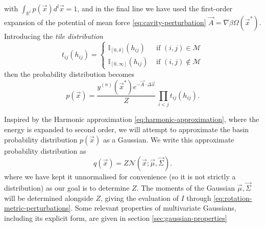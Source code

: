 \documentclass[11pt,twoside]{report}
\begin{document}
with $\int_{\mathbb{R}^l} p(\vec{x}) d^l\vec{x} = 1$, and in the final line we have used the first-order expansion of the potential of mean force \eqref{eq:cavity-perturbation} $\vec{A} = \nabla \beta\Omega(\vec{x}^*)$.
Introducing the \emph{tile distribution}
\begin{equation}\label{eq:ep-tile-distribution}
  t_{ij}(h_{ij})
  =
  \begin{cases}
    \mathbb{I}_{[0, \delta]}(h_{ij}) & \textrm{ if } (i,j) \in \mathcal{M} \\
    \mathbb{I}_{[0, \infty]}(h_{ij}) & \textrm{ if } (i,j) \notin \mathcal{M}
  \end{cases}
\end{equation}
then the probability distribution becomes
\begin{equation}\label{eq:ep-p-tiles}
  p(\vec{x})
  =
  \frac{y^{(n)}(\vec{x}^*) e^{-\vec{A} \cdot \Delta \vec{x}}}{Z}
  \,
  \prod_{i < j} t_{ij}(h_{ij}).
\end{equation}

Inspired by the Harmonic approximation \eqref{eq:harmonic-approximation}, where the energy is expanded to second order, we will attempt to approximate the basin probability distribution $p(\vec{x})$ as a Gaussian.
We write this approximate probability distribution as
\begin{equation}
  q(\vec{x}) = Z \mathcal{N}(\vec{x}; \vec{\mu}, \vec{\Sigma}).
\end{equation}
where we have kept it unnormalised for convenience (so it is not strictly a distribution) as our goal is to determine $Z$.
The moments of the Gaussian $\vec{\mu}, \vec{\Sigma}$ will be determined alongside $Z$, giving the evaluation of $I$ through \eqref{eq:rotation-metric-perturbations}.
Some relevant properties of multivariate Gaussians, including its explicit form, are given in section \ref{sec:gaussian-properties}
\end{document}

